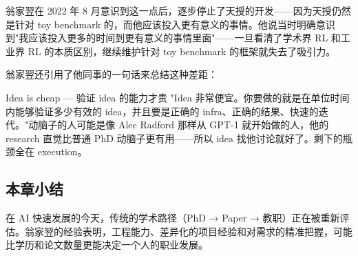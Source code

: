 翁家翌在 2022 年 8 月意识到这一点后，逐步停止了天授的开发——因为天授仍然是针对 toy benchmark 的，而他应该投入更有意义的事情。他说当时明确意识到"我应该投入更多的时间到更有意义的事情里面"——一旦看清了学术界 RL 和工业界 RL 的本质区别，继续维护针对 toy benchmark 的框架就失去了吸引力。

翁家翌还引用了他同事的一句话来总结这种差距：

\begin{importantbox}{Idea is cheap --- 验证 idea 的能力才贵}
"Idea 非常便宜。你要做的就是在单位时间内能够验证多少有效的 idea，并且要是正确的 infra、正确的结果、快速的迭代。"动脑子的人可能是像 Alec Radford 那样从 GPT-1 就开始做的人，他的 research 直觉比普通 PhD 动脑子更有用——所以 idea 找他讨论就好了。剩下的瓶颈全在 execution。
\end{importantbox}

\subsection{本章小结}

在 AI 快速发展的今天，传统的学术路径（PhD → Paper → 教职）正在被重新评估。翁家翌的经验表明，工程能力、差异化的项目经验和对需求的精准把握，可能比学历和论文数量更能决定一个人的职业发展。


